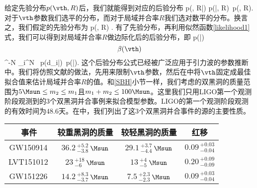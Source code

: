 给定先验分布$p(\vth, R)$后，我们就能得到对应的后验分布
\e\label{post1} 
p(\vth, R|\vd) \propto p(\vd |\vth, R)\ p(\vth, R).
\q 
对于$\vth$参数我们选平的分布，而对于局域并合率$R$我们选对数平的分布。换言之，我们假定的先验分布为
\e 
p(\vth, R) \propto {}.
\q 
有了先验分布，再利用似然函数\eqref{likelihood1}式，我们可以得到对局域并合率$R$做边际化后的后验分布，即
\e\label{post_vth1} 
p(\vth|\vd) \propto \[\beta(\vth)\]^{-N} 
\prod_i^N \int \rmd\vla\ p(d_i|\vla)\ p(\vla|\vth).
\q
这个后验分布公式已经被广泛应用于引力波的参数推断中\citep{Abbott:2016nhf,Abbott:2017vtc,TheLIGOScientific:2016pea,Abbott:2016drs,Fishbach:2017zga}。我们将仿照文献\cite{Abbott:2016nhf,TheLIGOScientific:2016pea,Abbott:2016drs,Abbott:2017vtc}的做法，先用来限制$\vth$参数，然后在中将$\vth$固定成最佳拟合值来估计局域并合率$R$的值。和\ref{SBH}小节一样，我们考虑的双黑洞的质量范围为$5\Msun \leq m_2 \leq m_1$且$m_1 + m_2 \leq 100\Msun$。这里我们只用LIGO第一个观测阶段观测到的$3$个双黑洞并合事例来拟合模型参数。LIGO的第一个观测阶段观测的有效时间为$48.6$天\citep{TheLIGOScientific:2016pea}。在中，我们列出了这$3$个双黑洞并合事件的源的主要性质。

\begin{table}[htb!]
    \centering
    \begin{tabular}{c|c|c|c}
        事件 & 较重黑洞的质量 & 较轻黑洞的质量 & 红移\\
        \hline
        GW150914\, 
        &  $36.2\,^{+5.2}_{-3.8}$\,$\Msun$ & $29.1\,^{+3.7}_{-4.4}$\,$\Msun$ 
        & $0.09\,^{+0.03}_{-0.04}$\\
        [.3em]
        \hline
        LVT151012\, 
        & $23\,^{+18}_{-6}$\,$\Msun$  & $13\,^{+4}_{-5}$\,$\Msun$ 
        & $0.20\,^{+0.09}_{-0.09}$\\
        [.3em]
        \hline
        GW151226\, 
        &  $14.2\,^{+8.3}_{-3.7}$\,$\Msun$  & $7.5\,^{+2.3}_{-2.3}$\,$\Msun$ 
        & $0.09\,^{+0.03}_{-0.04}$\\
        [.3em]
        \hline
    \end{tabular}
    \label{events2}
\end{table}

